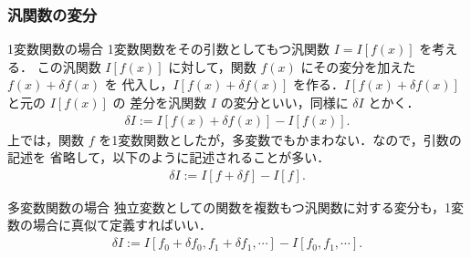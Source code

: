             \subsubsection{汎関数の変分}
                \begin{mysmallsec}{1変数関数の場合}
                    1変数関数をその引数としてもつ汎関数 $I = I[f(x)]$ を考える．
                    この汎関数 $I[f(x)]$ に対して，関数 $f(x)$ にその変分を加えた $f(x) + \delta f(x)$ を
                    代入し，$I[f(x)+\delta f(x)]$ を作る．$I[f(x)+\delta f(x)]$ と元の $I[f(x)] $ の
                    差分を汎関数 $I$ の変分といい，同様に $\delta I$ とかく．
                        \begin{align*}
                            \delta I := I[f(x)+\delta f(x)] - I[f(x)].
                        \end{align*}
                    上では，関数 $f$ を1変数関数としたが，多変数でもかまわない．なので，引数の記述を
                    省略して，以下のように記述されることが多い．
                        \begin{align}
                            \delta I := I[f+\delta f] - I[f].
                        \end{align}
                \end{mysmallsec}

                \begin{mysmallsec}{多変数関数の場合}
                    独立変数としての関数を複数もつ汎関数に対する変分も，1変数の場合に真似て定義すればいい．
                        \begin{align}
                            \delta I :=   I[f_{0}+\delta f_{0}, f_{1}+\delta f_{1}, \cdots]
                                        - I[f_{0}, f_{1}, \cdots].
                        \end{align}
                \end{mysmallsec}

